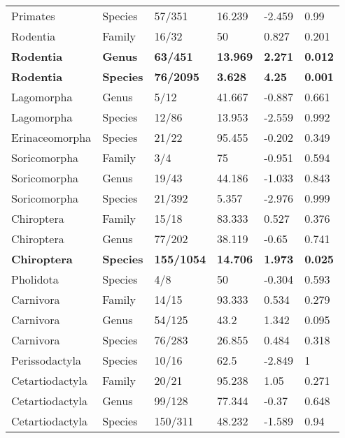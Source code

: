 \begin{longtable}{llllll}
  Primates & Species & 57/351 & 16.239 & -2.459 & 0.99 \\ 
  Rodentia & Family & 16/32 & 50 & 0.827 & 0.201 \\ 
  \textbf{Rodentia} & \textbf{Genus} & \textbf{63/451} & \textbf{13.969} & \textbf{2.271} & \textbf{0.012} \\ 
  \textbf{Rodentia} & \textbf{Species} & \textbf{76/2095} & \textbf{3.628} & \textbf{4.25} & \textbf{0.001} \\ 
  Lagomorpha & Genus & 5/12 & 41.667 & -0.887 & 0.661 \\ 
  Lagomorpha & Species & 12/86 & 13.953 & -2.559 & 0.992 \\ 
  Erinaceomorpha & Species & 21/22 & 95.455 & -0.202 & 0.349 \\ 
  Soricomorpha & Family & 3/4 & 75 & -0.951 & 0.594 \\ 
  Soricomorpha & Genus & 19/43 & 44.186 & -1.033 & 0.843 \\ 
  Soricomorpha & Species & 21/392 & 5.357 & -2.976 & 0.999 \\ 
  Chiroptera & Family & 15/18 & 83.333 & 0.527 & 0.376 \\ 
  Chiroptera & Genus & 77/202 & 38.119 & -0.65 & 0.741 \\ 
  \textbf{Chiroptera} & \textbf{Species} & \textbf{155/1054} & \textbf{14.706} & \textbf{1.973} & \textbf{0.025} \\ 
  Pholidota & Species & 4/8 & 50 & -0.304 & 0.593 \\ 
  Carnivora & Family & 14/15 & 93.333 & 0.534 & 0.279 \\ 
  Carnivora & Genus & 54/125 & 43.2 & 1.342 & 0.095 \\ 
  Carnivora & Species & 76/283 & 26.855 & 0.484 & 0.318 \\ 
  Perissodactyla & Species & 10/16 & 62.5 & -2.849 & 1 \\ 
  Cetartiodactyla & Family & 20/21 & 95.238 & 1.05 & 0.271 \\ 
  Cetartiodactyla & Genus & 99/128 & 77.344 & -0.37 & 0.648 \\ 
  Cetartiodactyla & Species & 150/311 & 48.232 & -1.589 & 0.94 \\ 
   \hline
\hline
\end{longtable}
